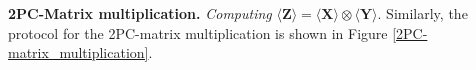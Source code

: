 \documentclass[letterpaper]{article} %
\begin{document}
    \textbf{2PC-Matrix multiplication.}
    \emph{Computing} $ \langle \mathbf{Z}\rangle  = \langle \mathbf{X}\rangle  \otimes \langle \mathbf{Y}\rangle$.
    Similarly, the protocol for the 2PC-matrix multiplication is shown in Figure \ref{2PC-matrix_multiplication}.
    \begin{figure}[ht]
\end{figure}
\end{document}
